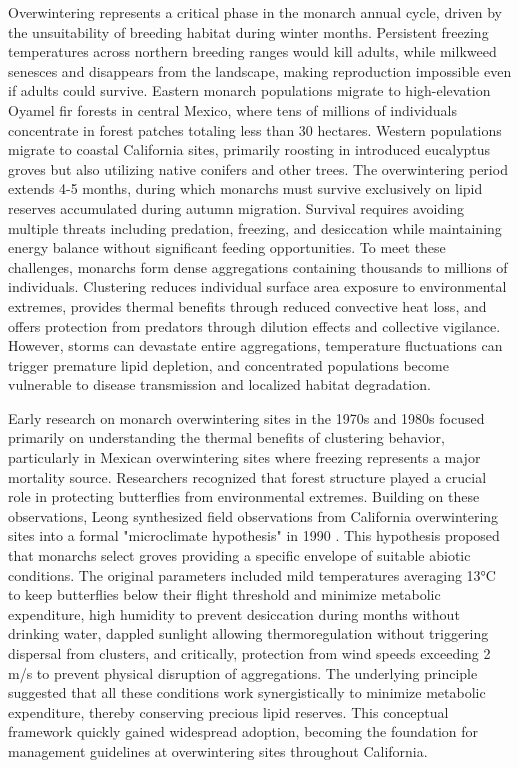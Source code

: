 Overwintering represents a critical phase in the monarch annual cycle, driven by the unsuitability of breeding habitat during winter months. Persistent freezing temperatures across northern breeding ranges would kill adults, while milkweed senesces and disappears from the landscape, making reproduction impossible even if adults could survive. Eastern monarch populations migrate to high-elevation Oyamel fir forests in central Mexico, where tens of millions of individuals concentrate in forest patches totaling less than 30 hectares. Western populations migrate to coastal California sites, primarily roosting in introduced eucalyptus groves but also utilizing native conifers and other trees. The overwintering period extends 4-5 months, during which monarchs must survive exclusively on lipid reserves accumulated during autumn migration. Survival requires avoiding multiple threats including predation, freezing, and desiccation while maintaining energy balance without significant feeding opportunities. To meet these challenges, monarchs form dense aggregations containing thousands to millions of individuals. Clustering reduces individual surface area exposure to environmental extremes, provides thermal benefits through reduced convective heat loss, and offers protection from predators through dilution effects and collective vigilance. However, storms can devastate entire aggregations, temperature fluctuations can trigger premature lipid depletion, and concentrated populations become vulnerable to disease transmission and localized habitat degradation.

Early research on monarch overwintering sites in the 1970s and 1980s focused primarily on understanding the thermal benefits of clustering behavior, particularly in Mexican overwintering sites where freezing represents a major mortality source. Researchers recognized that forest structure played a crucial role in protecting butterflies from environmental extremes. Building on these observations, Leong synthesized field observations from California overwintering sites into a formal "microclimate hypothesis" in 1990 \citep{leongMicroenvironmentalFactorsAssociated1990}. This hypothesis proposed that monarchs select groves providing a specific envelope of suitable abiotic conditions. The original parameters included mild temperatures averaging 13°C to keep butterflies below their flight threshold and minimize metabolic expenditure, high humidity to prevent desiccation during months without drinking water, dappled sunlight allowing thermoregulation without triggering dispersal from clusters, and critically, protection from wind speeds exceeding 2 m/s to prevent physical disruption of aggregations. The underlying principle suggested that all these conditions work synergistically to minimize metabolic expenditure, thereby conserving precious lipid reserves. This conceptual framework quickly gained widespread adoption, becoming the foundation for management guidelines at overwintering sites throughout California.

